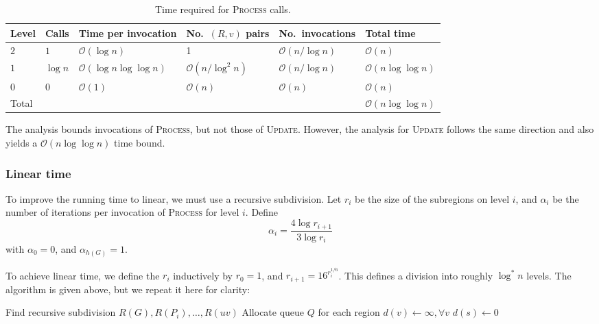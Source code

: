 \documentclass[11pt]{article}
\newcommand{\ra}[1]{\renewcommand{\arraystretch}{#1}}
\begin{document}
\begin{table}[!h]\centering
\caption{Time required for \textsc{Process} calls.}
\label{tab:process}
\ra{1.3}
\begin{tabular}{@{}llllll@{}} \toprule
  Level & Calls & Time per invocation & No.\ $(R,v)$ pairs & No.\ invocations & Total time\\ \midrule
  $2$ & $1$ & $\mathcal{O}(\log n)$ & 1 & $\mathcal{O}(n/\log n)$ & $\mathcal{O}(n)$\\
  $1$ & $\log n$ & $\mathcal{O}(\log n \log \log n)$ & $\mathcal{O}(n/\log^2 n)$ & $\mathcal{O}(n/\log n)$ & $\mathcal{O}(n\log \log n)$\\
  $0$ & $0$ & $\mathcal{O}(1)$ & $\mathcal{O}(n)$ & $\mathcal{O}(n)$ & $\mathcal{O}(n)$\\ \midrule
  Total & & & & & $\mathcal{O}(n\log \log n)$\\
  \bottomrule
\end{tabular}
\end{table}

The analysis bounds invocations of \textsc{Process}, but not those of \textsc{Update}. However, the analysis for \textsc{Update} follows the same direction and also yields a $\mathcal{O}(n \log \log n)$ time bound.

\subsubsection{Linear time}
\label{sec:linear-time}

To improve the running time to linear, we must use a recursive subdivision. Let $r_i$ be the size of the subregions on level $i$, and $\alpha_i$ be the number of iterations per invocation of \textsc{Process} for level $i$. Define
\[
  \alpha_i = \frac{4\log r_{i+1}}{3 \log r_i}
\]
with $\alpha_0 = 0$, and $\alpha_{h(G)} = 1$.

To achieve linear time, we define the $r_i$ inductively by $r_0 = 1$, and $r_{i+1} = 16^{r_i^{1/6}}$. This defines a division into roughly $\log^{*} n$ levels. The algorithm is given above, but we repeat it here for clarity:

\begin{algorithm}
  \begin{algorithmic}[1]
    \State Find recursive subdivision $R(G), R(P_i), \ldots, R(uv)$
    \State Allocate queue $Q$ for each region
    \State $d(v) \gets \infty, \forall v$
    \State $d(s) \gets 0$
      \State {}
    \EndFor
      \State {}
    \EndWhile
  \end{algorithmic}
\end{algorithm}
\end{document}
